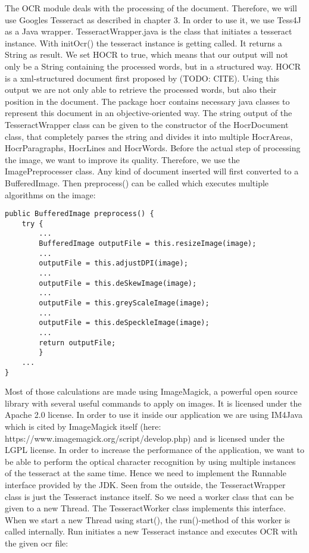 The OCR module deals with the processing of the document. Therefore, we will use Googles Tesseract as described in chapter 3. In order to use it, we use Tess4J as a Java wrapper. TesseractWrapper.java is the class that initiates a tesseract instance. With initOcr() the tesseract instance is getting called. It returns a String as result. 
We set HOCR to true, which means that our output will not only be a String containing the processed words, but in a structured way. HOCR is a xml-structured document first proposed by (TODO: CITE). Using this output we are not only able to retrieve the processed words, but also their position in the document.
The package hocr contains necessary java classes to represent this document in an objective-oriented way. The string output of the TesseractWrapper class can be given to the constructor of the HocrDocument class, that completely parses the string and divides it into multiple HocrAreas, HocrParagraphs, HocrLines and HocrWords.
Before the actual step of processing the image, we want to improve its quality. Therefore, we use the ImagePreprocesser class. Any kind of document inserted will first converted to a BufferedImage. Then preprocess() can be called which executes multiple algorithms on the image:

\begin{lstlisting}
public BufferedImage preprocess() {
    try {
        ...
        BufferedImage outputFile = this.resizeImage(image);
		...
        outputFile = this.adjustDPI(image);
		...
        outputFile = this.deSkewImage(image);
		...
        outputFile = this.greyScaleImage(image);
		...
        outputFile = this.deSpeckleImage(image);
		...
        return outputFile;
        } 
  	...
}
\end{lstlisting}

Most of those calculations are made using ImageMagick, a powerful open source library with several useful commands to apply on images. It is licensed under the Apache 2.0 license. In order to use it inside our application we are using IM4Java which is cited by ImageMagick itself (here: https://www.imagemagick.org/script/develop.php) and is licensed under the LGPL license.
In order to increase the performance of the application, we want to be able to perform the optical character recognition by using multiple instances of the tesseract at the same time. Hence we need to implement the Runnable interface provided by the JDK. Seen from the outside, the TesseractWrapper class is just the Tesseract instance itself. So we need a worker class that can be given to a new Thread. The TesseractWorker class implements this interface. When we start a new Thread using start(), the run()-method of this worker is called internally. Run initiates a new Tesseract instance and executes OCR with the given ocr file: 

